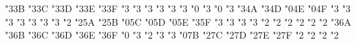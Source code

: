 \mathchardef \fallingdotseq   "3\amsafam 3B
\mathchardef \succcurlyeq   "3\amsafam 3C
\mathchardef \geqq   "3\amsafam 3D
\mathchardef \geqslant   "3\amsafam 3E
\mathchardef \gtrless   "3\amsafam 3F
\mathchardef \sqsubset   "3
\mathchardef \sqsupset   "3
\mathchardef \vartriangleright   "3
\mathchardef \vartriangleleft   "3
\mathchardef \trianglerighteq   "3
\mathchardef \trianglelefteq   "3
\mathchardef \bigstar   "0
\mathchardef \between   "3
\mathchardef \blacktriangledown   "0
\mathchardef \blacktriangleright   "3
\mathchardef \blacktriangleleft   "3\amsafam 4A
\mathchardef \vartriangle   "3\amsafam 4D
\mathchardef \blacktriangle   "0\amsafam 4E
\mathchardef \triangledown   "0\amsafam 4F
\mathchardef \eqcirc   "3
\mathchardef \lesseqgtr   "3
\mathchardef \gtreqless   "3
\mathchardef \lesseqqgtr   "3
\mathchardef \gtreqqless   "3
\mathchardef \Rrightarrow   "3
\mathchardef \Lleftarrow   "3
\mathchardef \veebar   "2
\mathchardef \barwedge   "2\amsafam 5A
\mathchardef \doublebarwedge   "2\amsafam 5B
\mathchardef \angle   "0\amsafam 5C
\mathchardef \measuredangle   "0\amsafam 5D
\mathchardef \sphericalangle   "0\amsafam 5E
\mathchardef \varpropto   "3\amsafam 5F
\mathchardef \smallsmile   "3
\mathchardef \smallfrown   "3
\mathchardef \Subset   "3
\mathchardef \Supset   "3
\mathchardef \Cup   "2
\mathchardef \Cap   "2
\mathchardef \curlywedge   "2
\mathchardef \curlyvee   "2
\mathchardef \leftthreetimes   "2
\mathchardef \rightthreetimes   "2
\mathchardef \subseteqq   "3\amsafam 6A
\mathchardef \supseteqq   "3\amsafam 6B
\mathchardef \bumpeq   "3\amsafam 6C
\mathchardef \Bumpeq   "3\amsafam 6D
\mathchardef \lll   "3\amsafam 6E
\mathchardef \ggg   "3\amsafam 6F
\def \ulcorner {\delimiter"4\amsafam 70\amsafam 70 }
\def \urcorner {\delimiter"5\amsafam 71\amsafam 71 }
\mathchardef \circledS   "0
\mathchardef \pitchfork   "3
\mathchardef \dotplus   "2
\mathchardef \backsim   "3
\mathchardef \backsimeq   "3
\def \llcorner {\delimiter"4\amsafam 78\amsafam 78 }
\def \lrcorner {\delimiter"5\amsafam 79\amsafam 79 }
\mathchardef \complement   "0\amsafam 7B
\mathchardef \intercal   "2\amsafam 7C
\mathchardef \circledcirc   "2\amsafam 7D
\mathchardef \circledast   "2\amsafam 7E
\mathchardef \circleddash   "2\amsafam 7F
\mathchardef \rhd   "2
\mathchardef \lhd   "2
\mathchardef \unrhd   "2
\mathchardef \unlhd   "2

